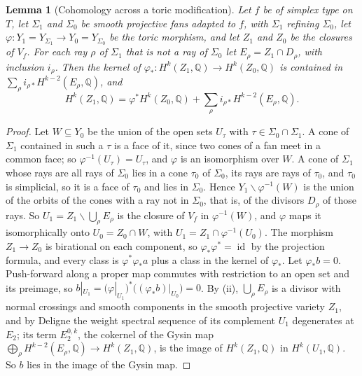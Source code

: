 \documentclass[11pt,reqno]{amsart}
\theoremstyle{plain}
\newtheorem{lemma}[theorem]{Lemma}
\theoremstyle{definition}
\theoremstyle{remark}
\newcommand{\QQ}{\mathbb{Q}}
\DeclareMathOperator{\id}{id}
\begin{document}
\begin{lemma}[Cohomology across a toric modification]\label{lem:toricmod}
Let $f$ be of simplex type on $T$, let $\Sigma_{1}$ and $\Sigma_{0}$ be
smooth projective fans adapted to $f$, with $\Sigma_{1}$ refining
$\Sigma_{0}$, let $\varphi\colon Y_{1}=Y_{\Sigma_{1}}\to Y_{0}=Y_{\Sigma_{0}}$
be the toric morphism, and let $Z_{1}$ and $Z_{0}$ be the closures of
$V_{f}$. For each ray $\rho$ of $\Sigma_{1}$ that is not a ray of
$\Sigma_{0}$ let $E_{\rho}=Z_{1}\cap D_{\rho}$, with inclusion $i_{\rho}$.
Then the kernel of $\varphi_{*}\colon H^{k}(Z_{1},\QQ)\to H^{k}(Z_{0},\QQ)$ is
contained in $\sum_{\rho}i_{\rho*}H^{k-2}(E_{\rho},\QQ)$, and
\[
  H^{k}(Z_{1},\QQ)=\varphi^{*}H^{k}(Z_{0},\QQ)
  +\sum_{\rho}i_{\rho*}H^{k-2}(E_{\rho},\QQ).
\]
\end{lemma}

\begin{proof}
Let $W\subseteq Y_{0}$ be the union of the open sets $U_{\tau}$ with
$\tau\in\Sigma_{0}\cap\Sigma_{1}$. A cone of $\Sigma_{1}$ contained in such a
$\tau$ is a face of it, since two cones of a fan meet in a common face; so
$\varphi^{-1}(U_{\tau})=U_{\tau}$, and $\varphi$ is an isomorphism over $W$. A
cone of $\Sigma_{1}$ whose rays are all rays of $\Sigma_{0}$ lies in a cone
$\tau_{0}$ of $\Sigma_{0}$, its rays are rays of $\tau_{0}$, and $\tau_{0}$
is simplicial, so it is a face of $\tau_{0}$ and lies in $\Sigma_{0}$. Hence
$Y_{1}\smallsetminus\varphi^{-1}(W)$ is the union of the orbits of the cones
with a ray not in $\Sigma_{0}$, that is, of the divisors $D_{\rho}$ of those
rays. So $U_{1}=Z_{1}\smallsetminus\bigcup_{\rho}E_{\rho}$ is the closure of
$V_{f}$ in $\varphi^{-1}(W)$, and $\varphi$ maps it isomorphically onto
$U_{0}=Z_{0}\cap W$, with $U_{1}=Z_{1}\cap\varphi^{-1}(U_{0})$. The morphism
$Z_{1}\to Z_{0}$ is birational on each component, so $\varphi_{*}\varphi^{*}
=\id$ by the projection formula, and every class is $\varphi^{*}\varphi_{*}a$
plus a class in the kernel of $\varphi_{*}$. Let $\varphi_{*}b=0$.
Push-forward along a proper map commutes with restriction to an open set and
its preimage, so $b|_{U_{1}}=(\varphi|_{U_{1}})^{*}\bigl((\varphi_{*}b)|_{U_{0}}
\bigr)=0$. By (ii), $\bigcup_{\rho}E_{\rho}$ is a
divisor with normal crossings and smooth components in the smooth projective
variety $Z_{1}$, and by Deligne \cite[\S3.2]{Del71} the weight spectral
sequence of its complement $U_{1}$ degenerates at $E_{2}$; its term
$E_{2}^{0,k}$, the cokernel of the Gysin map
$\bigoplus_{\rho}H^{k-2}(E_{\rho},\QQ)\to H^{k}(Z_{1},\QQ)$, is the image of
$H^{k}(Z_{1},\QQ)$ in $H^{k}(U_{1},\QQ)$. So $b$ lies in the image of the
Gysin map.
\end{proof}
\end{document}
